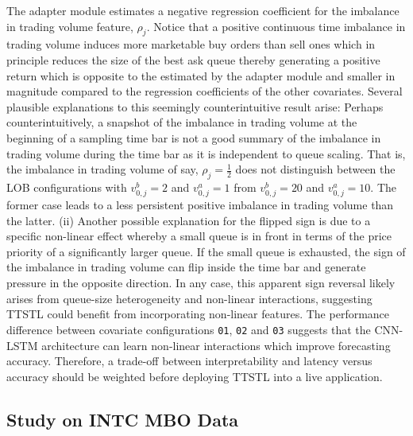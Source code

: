 \documentclass{rQUF2e}
\theoremstyle{plain}
\theoremstyle{definition}
\theoremstyle{remark}
\begin{document}
The adapter module estimates a negative regression coefficient for the imbalance in trading volume feature, $\rho_j$. Notice that a positive continuous time imbalance in trading volume induces more marketable buy orders than sell ones which in principle reduces the size of the best ask queue thereby generating a positive return which is opposite to the estimated by the adapter module and smaller in magnitude compared to the regression coefficients of the other covariates. Several plausible explanations to this seemingly counterintuitive result arise: Perhaps counterintuitively, a snapshot of the imbalance in trading volume at the beginning of a sampling time bar is not a good summary of the imbalance in trading volume during the time bar as it is independent to queue scaling. That is, the imbalance in trading volume of say, $\rho_j = \frac{1}{2}$ does not distinguish between the LOB configurations with $v^b_{0,j} = 2$ and $v^a_{0, j} = 1$ from $v^b_{0,j} = 20$ and $v^a_{0, j} = 10$. The former case leads to a less persistent positive imbalance in trading volume than the latter. (ii) Another possible explanation for the flipped sign is due to a specific non-linear effect whereby a small queue is in front in terms of the price priority of a significantly larger queue. If the small queue is exhausted, the sign of the imbalance in trading volume can flip inside the time bar and generate pressure in the opposite direction. In any case, this apparent sign reversal likely arises from queue-size heterogeneity and non-linear interactions, suggesting TTSTL could benefit from incorporating non-linear features. The performance difference between covariate configurations  \verb|01|, \verb|02| and \verb|03| suggests that the CNN-LSTM architecture can learn non-linear interactions which improve forecasting accuracy. Therefore, a trade-off between interpretability and latency versus accuracy should be weighted before deploying TTSTL into a live application.

\subsection{Study on INTC MBO Data}
\label{subsec:results_intc}
\end{document}
